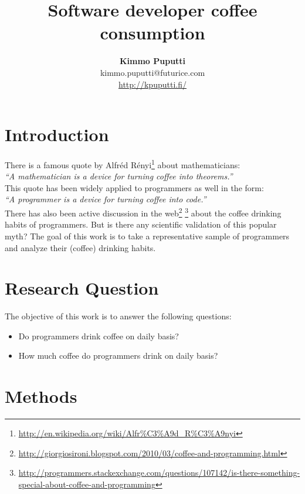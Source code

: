 \documentclass[a4paper,12pt]{article}
\title{Software developer coffee consumption}
\author{\textbf{Kimmo Puputti}\\kimmo.puputti@futurice.com\\\url{http://kpuputti.fi/}}
\begin{document}
\maketitle
\clearpage

\section{Introduction}

There is a famous quote by Alfréd
Rényi\footnote{\url{http://en.wikipedia.org/wiki/Alfr\%C3\%A9d_R\%C3\%A9nyi}}
about mathematicians:\\

\textit{``A mathematician is a device for turning coffee into theorems.''}\\

\noindent This quote has been widely applied to programmers as well in
the form:\\

\textit{``A programmer is a device for turning coffee into code.''}\\

\noindent There has also been active discussion in the
web\footnote{\url{http://giorgiosironi.blogspot.com/2010/03/coffee-and-programming.html}} \footnote{\url{http://programmers.stackexchange.com/questions/107142/is-there-something-special-about-coffee-and-programming}}
about the coffee drinking habits of programmers. But is there any
scientific validation of this popular myth? The goal of this work is
to take a representative sample of programmers and analyze their
(coffee) drinking habits.

\section{Research Question}
\label{rq}

The objective of this work is to answer the following questions:

\begin{itemize}
\item Do programmers drink coffee on daily basis?
\item How much coffee do programmers drink on daily basis?
\end{itemize}

\section{Methods}
\label{methods}
\end{document}
